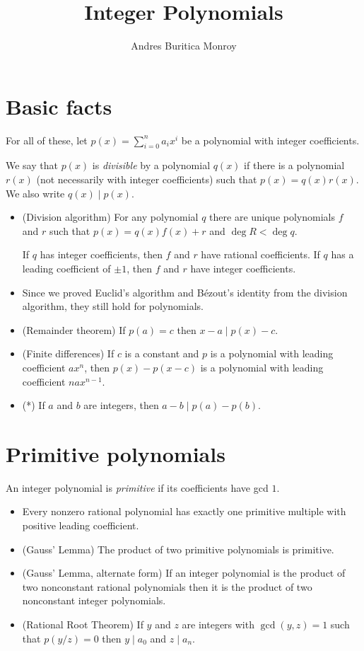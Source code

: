 \documentclass{article}
\title{Integer Polynomials}
\author{Andres Buritica Monroy}
\date{}
\begin{document}
\maketitle
\section{Basic facts}
For all of these, let $p(x)=\sum_{i=0}^n a_i x^i$ be a polynomial with integer
coefficients.

We say that $p(x)$ is \emph{divisible} by a polynomial $q(x)$ if there is a
polynomial $r(x)$ (not necessarily with integer coefficients) such that
$p(x)=q(x)r(x)$. We also write $q(x)\mid p(x)$.
\begin{itemize}
	\item (Division algorithm) For any polynomial $q$ there are unique
	      polynomials $f$ and $r$ such that $p(x)=q(x)f(x)+r$ and $\deg R<\deg q$.

	      If $q$ has integer coefficients, then $f$ and $r$ have rational
	      coefficients. If $q$ has a leading coefficient of $\pm 1$, then $f$ and $r$
	      have integer coefficients.
	\item Since we proved Euclid's algorithm and B\'ezout's identity from the
	      division algorithm, they still hold for polynomials.
	\item (Remainder theorem) If $p(a)=c$ then $x-a\mid p(x)-c$.
	\item (Finite differences) If $c$ is a constant and $p$ is a polynomial with
	      leading coefficient $ax^n$, then $p(x)-p(x-c)$ is a polynomial with
	      leading coefficient $nax^{n-1}$.
	\item (*) If $a$ and $b$ are integers, then $a-b\mid p(a)-p(b)$.
\end{itemize}
\section{Primitive polynomials}
An integer polynomial is \emph{primitive} if its coefficients have gcd $1$.
\begin{itemize}
	\item Every nonzero rational polynomial has exactly one primitive multiple
	      with positive leading coefficient.
	\item (Gauss' Lemma) The product of two primitive polynomials is primitive.
	\item (Gauss' Lemma, alternate form) If an integer polynomial is the product
	      of two nonconstant rational polynomials then it is the product of two
	      nonconstant integer polynomials.
	\item (Rational Root Theorem) If $y$ and $z$ are integers with $\gcd(y,z)=1$
	      such that $p(y/z)=0$ then $y\mid a_0$ and $z\mid a_n$.
\end{itemize}
\end{document}
